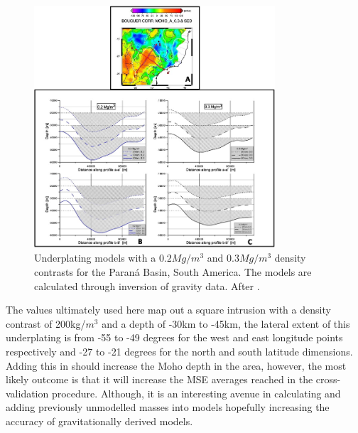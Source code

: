 \begin{figure}[h]
  \begin{center}
    \includegraphics[width=0.8\textwidth]{figures/underplating}
  \end{center}
  \caption{
   Underplating models with a $0.2Mg/m^3$ and $0.3Mg/m^3$ density contrasts for the Paraná Basin, South America. The models are calculated through inversion of gravity data. After \cite{Mariani2013}.
  }
  \label{fig:underplating}
\end{figure}
The values ultimately used here map out a square intrusion with a density contrast of 200kg/$m^3$ and a depth of -30km to -45km, the lateral extent of this underplating is from -55 to -49 degrees for the west and east longitude points respectively and -27 to -21 degrees for the north and south latitude dimensions. Adding this in should increase the Moho depth in the area, however, the most likely outcome is that it will increase the MSE averages reached in the cross-validation procedure. Although, it is an interesting avenue in calculating and adding previously unmodelled masses into models hopefully increasing the accuracy of gravitationally derived models.
